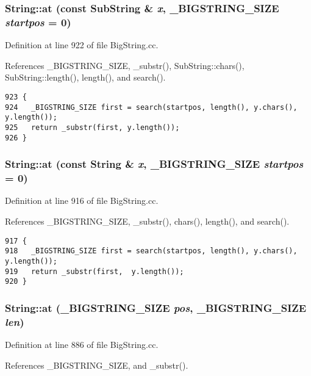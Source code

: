 \subsubsection{ String::at (const {\bf Sub\-String} \& {\em x}, {\bf \_\-BIGSTRING\_\-SIZE} {\em startpos} = 0)}\label{classString_a54}




Definition at line 922 of file Big\-String.cc.

References \_\-BIGSTRING\_\-SIZE, \_\-substr(), Sub\-String::chars(), Sub\-String::length(), length(), and search().



\footnotesize\begin{verbatim}923 {
924   _BIGSTRING_SIZE first = search(startpos, length(), y.chars(), y.length());
925   return _substr(first, y.length());
926 }
\end{verbatim}\normalsize 
{}
\subsubsection{ String::at (const String \& {\em x}, {\bf \_\-BIGSTRING\_\-SIZE} {\em startpos} = 0)}\label{classString_a53}




Definition at line 916 of file Big\-String.cc.

References \_\-BIGSTRING\_\-SIZE, \_\-substr(), chars(), length(), and search().



\footnotesize\begin{verbatim}917 {
918   _BIGSTRING_SIZE first = search(startpos, length(), y.chars(), y.length());
919   return _substr(first,  y.length());
920 }
\end{verbatim}\normalsize 
{}
\subsubsection{ String::at ({\bf \_\-BIGSTRING\_\-SIZE} {\em pos}, {\bf \_\-BIGSTRING\_\-SIZE} {\em len})}\label{classString_a51}




Definition at line 886 of file Big\-String.cc.

References \_\-BIGSTRING\_\-SIZE, and \_\-substr().

